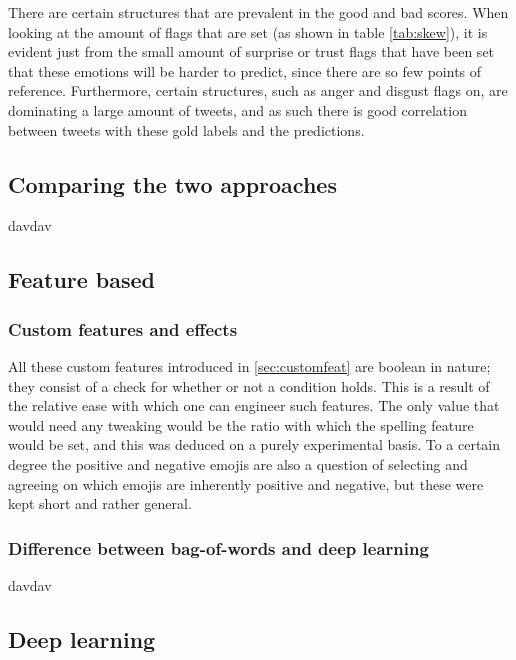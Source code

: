 There are certain structures that are prevalent in the good and bad scores. When looking at the amount of flags that are set (as shown in table \ref{tab:skew}), it is evident just from the small amount of surprise or trust flags that have been set that these emotions will be harder to predict, since there are so few points of reference. Furthermore, certain structures, such as anger and disgust flags on, are dominating a large amount of tweets, and as such there is good correlation between tweets with these gold labels and the predictions.


\subsection{Comparing the two approaches}
davdav

\subsection{Feature based}
\subsubsection{Custom features and effects}
All these custom features introduced in \ref{sec:customfeat} are boolean in nature; they consist of a check for whether or not a condition holds. This is a result of the relative ease with which one can engineer such features. The only value that would need any tweaking would be the ratio with which the spelling feature would be set, and this was deduced on a purely experimental basis. To a certain degree the positive and negative emojis are also a question of selecting and agreeing on which emojis are inherently positive and negative, but these were kept short and rather general.

\subsubsection{Difference between bag-of-words and deep learning}
davdav

\subsection{Deep learning}

